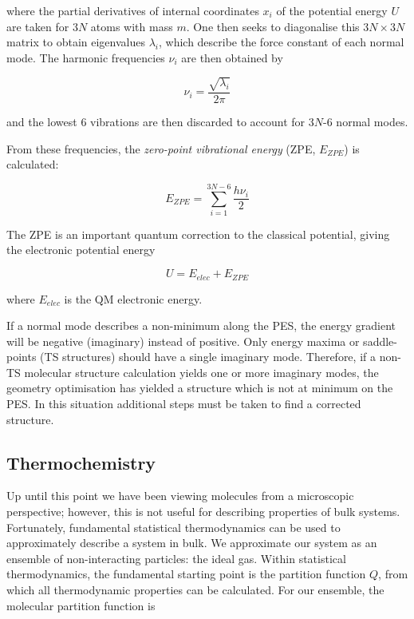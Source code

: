 \noindent where the partial derivatives of internal coordinates $x_i$ of the
potential energy $U$ are taken for 3$N$ atoms with mass $m$. One then seeks to
diagonalise this $3N\times3N$ matrix to obtain eigenvalues $\lambda_i$, which
describe the force constant of each normal mode. The harmonic frequencies $\nu_i$ are
then obtained by

\begin{equation}
  \nu_i = \frac{\sqrt{\lambda_i}}{2\pi}
\end{equation}

\noindent and the lowest 6 vibrations are then discarded to account for 3$N$-6
normal modes.

From these frequencies, the \emph{zero-point vibrational energy} (ZPE, $E_{ZPE}$) is
calculated:

\begin{equation}
  E_{ZPE} = \sum_{i=1}^{3N-6} \frac{h\nu_i}{2}
\end{equation}

\noindent The ZPE is an important quantum correction to the classical potential,
giving the electronic potential energy

\begin{equation}
U = E_{elec} + E_{ZPE}
\end{equation}

\noindent where $E_{elec}$ is the QM electronic energy.

If a normal mode describes a non-minimum along the PES, the energy gradient will
be negative (imaginary) instead of positive. Only energy maxima or saddle-points
(TS structures) should have a single imaginary mode. Therefore, if a non-TS
molecular structure calculation yields one or more imaginary modes, the geometry
optimisation has yielded a structure which is not at minimum on the PES. In this
situation additional steps must be taken to find a corrected structure.

\subsection{Thermochemistry}

Up until this point we have been viewing molecules from a microscopic
perspective; however, this is not useful for describing properties of bulk
systems. Fortunately, fundamental statistical thermodynamics can be used to
approximately describe a system in bulk.\cite{McQuarrie1999,McQuarrie2000} We
approximate our system as an ensemble of non-interacting particles: the ideal
gas. Within statistical thermodynamics, the fundamental starting point is the
partition function $Q$,\cite{note4} from which all thermodynamic properties can
be calculated. For our ensemble, the molecular partition function is

